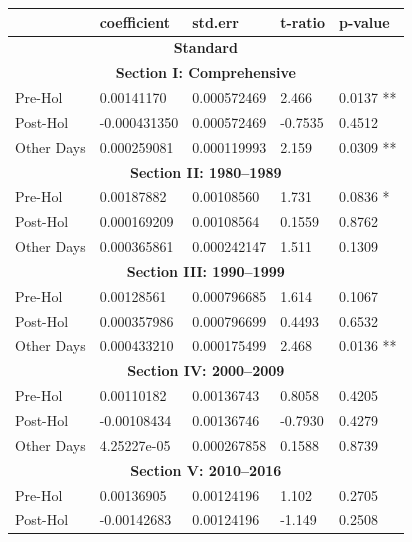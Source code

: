 \documentclass[11pt, english]{article}
\begin{document}
	\begin{center}
		\scriptsize
	\begin{longtable}{p{2cm}p{2cm}p{2cm}p{2cm}p{2cm}}
		& \textbf{coefficient} & \textbf{std.err} & \textbf{t-ratio} & \textbf{p-value}\\
		\hline
		\hline
		\multicolumn{5}{c}{\textbf{Standard}}\\
		\hline
		\hline
		\multicolumn{5}{c}{\textbf{Section I: Comprehensive}}\\
		\hline
		Pre-Hol & 0.00141170 & 0.000572469 & 2.466 & 0.0137 **\\
		Post-Hol & -0.000431350 & 0.000572469 & -0.7535 & 0.4512\\
		Other Days & 0.000259081 & 0.000119993 & 2.159 & 0.0309 **\\
		\hline
		\multicolumn{5}{c}{\textbf{Section II: 1980--1989}}\\
                \hline            
                Pre-Hol & 0.00187882 & 0.00108560 & 1.731 & 0.0836 *\\ 
                Post-Hol & 0.000169209 & 0.00108564 & 0.1559 & 0.8762\\  
                Other Days & 0.000365861 & 0.000242147 & 1.511 & 0.1309\\
                \hline
		\multicolumn{5}{c}{\textbf{Section III: 1990--1999}}\\
                \hline            
                Pre-Hol & 0.00128561 & 0.000796685 & 1.614 & 0.1067\\ 
                Post-Hol & 0.000357986 & 0.000796699 & 0.4493 & 0.6532\\  
                Other Days & 0.000433210 & 0.000175499 & 2.468 & 0.0136 **\\
                \hline
		\multicolumn{5}{c}{\textbf{Section IV: 2000--2009}}\\
                \hline            
                Pre-Hol & 0.00110182 & 0.00136743 & 0.8058 & 0.4205\\ 
                Post-Hol & -0.00108434 & 0.00136746 & -0.7930 & 0.4279\\  
                Other Days & 4.25227e-05 & 0.000267858 & 0.1588 & 0.8739\\
                \hline
		\multicolumn{5}{c}{\textbf{Section V: 2010--2016}}\\
                \hline            
                Pre-Hol & 0.00136905 & 0.00124196 & 1.102 & 0.2705\\ 
                Post-Hol & -0.00142683 & 0.00124196 & -1.149 & 0.2508\\  

\end{longtable}
\end{center}
\end{document}
